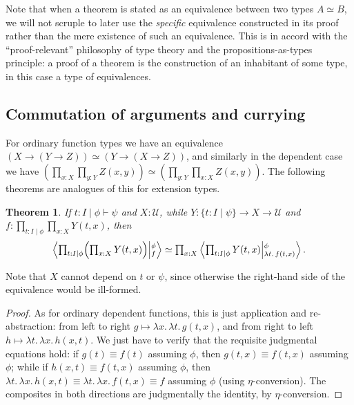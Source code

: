 \documentclass{amsart}
\theoremstyle{plain}
\newtheorem{thm}{Theorem}[section]
\theoremstyle{definition}
\theoremstyle{remark}
\numberwithin{equation}{section}
\newcommand{\tprod}{\textstyle\prod}
\newcommand{\exten}[4]{\left\langle\mathchoice{\textstyle\prod_{#1}}{\textstyle\prod_{#1}}{\scriptstyle\prod_{#1}}{\scriptscriptstyle\prod_{#1}} #2 \middle|^{#3}_{#4}\right\rangle}
\newcommand{\jdeq}{\equiv}
\newcommand{\types}{\vdash}
\newcommand{\univtype}{\mathcal{U}}
\newcommand{\sh}[2]{\{#1\mid #2\}}
\newcommand{\lam}[1]{\lambda #1.\,}
\newcommand{\Parens}[1]{\Bigl(#1\Bigr)}
\begin{document}
Note that when a theorem is stated as an equivalence between two types $A \simeq B$, we will not scruple to later use the \emph{specific} equivalence constructed in its proof rather than the mere existence of such an equivalence.
  This is in accord with the ``proof-relevant'' philosophy of type theory and the propositions-as-types principle: a proof of a theorem is the construction of an inhabitant of some type, in this case a type of equivalences.


\subsection{Commutation of arguments and currying}
\label{sec:curry}

For ordinary function types we have an equivalence $(X\to (Y\to Z)) \simeq (Y\to (X\to Z))$, and similarly in the dependent case we have $\left(\prod_{x:X} \prod_{y:Y} Z(x,y)\right) \simeq \left(\prod_{y:Y} \prod_{x:X} Z(x,y)\right)$.
The following theorems are analogues of this for extension types.

\begin{thm}\label{thm:exten-prod-commute}
  If $t:I \mid \phi\types\psi$ and $X:\univtype$, while $Y:\sh{t:I}{\psi} \to X\to\univtype$ and $f:\prod_{t:I\mid\phi} \prod_{x:X} Y(t,x)$, then
  \[ \exten{t:I|\phi}{\Parens{\prod_{x:X} Y(t,x)}}{\phi}{f} \simeq
  \tprod_{x:X} \exten{t:I|\phi}{Y(t,x)}{\phi}{\lam{t}f(t,x)}.
  \]
\end{thm}
Note that $X$ cannot depend on $t$ or $\psi$, since otherwise the right-hand side of the equivalence would be ill-formed.
\begin{proof}
  As for ordinary dependent functions, this is just application and re-ab\-strac\-tion: from left to right $g\mapsto \lam{x} \lam{t} g(t,x)$, and from right to left $h \mapsto \lam{t}\lam{x} h(x,t)$.
  We just have to verify that the requisite judgmental equations hold: if $g(t)\jdeq f(t)$ assuming $\phi$, then $g(t,x)\jdeq f(t,x)$ assuming $\phi$; while if $h(x,t)\jdeq f(t,x)$ assuming $\phi$, then $\lam{t}\lam{x} h(x,t) \jdeq \lam{t}\lam{x}f(t,x) \jdeq f$ assuming $\phi$ (using $\eta$-conversion).
  The composites in both directions are judgmentally the identity, by $\eta$-conversion.
\end{proof}
\end{document}
